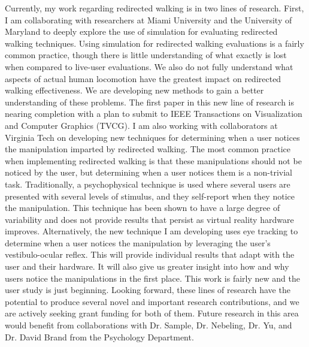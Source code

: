 Currently, my work regarding redirected walking is in two lines of research. First, I am collaborating with researchers at Miami University and the University of Maryland to deeply explore the use of simulation for evaluating redirected walking techniques. Using simulation for redirected walking evaluations is a fairly common practice, though there is little understanding of what exactly is lost when compared to live-user evaluations. We also do not fully understand what aspects of actual human locomotion have the greatest impact on redirected walking effectiveness. We are developing new methods to gain a better understanding of these problems. The first paper in this new line of research is nearing completion with a plan to submit to IEEE Transactions on Visualization and Computer Graphics (TVCG). I am also working with collaborators at Virginia Tech on developing new techniques for determining when a user notices the manipulation imparted by redirected walking. The most common practice when implementing redirected walking is that these manipulations should not be noticed by the user, but determining when a user notices them is a non-trivial task. Traditionally, a psychophysical technique is used where several users are presented with several levels of stimulus, and they self-report when they notice the manipulation. This technique has been shown to have a large degree of variability and does not provide results that persist as virtual reality hardware improves. Alternatively, the new technique I am developing uses eye tracking to determine when a user notices the manipulation by leveraging the user's vestibulo-ocular reflex. This will provide individual results that adapt with the user and their hardware. It will also give us greater insight into how and why users notice the manipulations in the first place. This work is fairly new and the user study is just beginning. Looking forward, these lines of research have the potential to produce several novel and important research contributions, and we are actively seeking grant funding for both of them. Future research in this area would benefit from collaborations with Dr. Sample, Dr. Nebeling, Dr. Yu, and Dr. David Brand from the Psychology Department.

